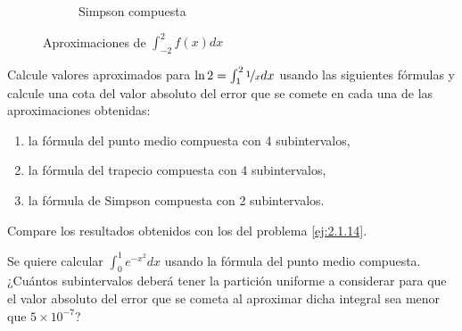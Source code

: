 \begin{ejercicio}
\begin{enumerate}
\begin{figure}
\begin{subfigure}[b]{0.3\textwidth}
                \caption{Simpson compuesta}
                \label{fig:ej2.1.17c}
            \end{subfigure}
            \caption{Aproximaciones de $\int_{-2}^{2} f(x) dx$}
            \label{fig:ej2.1.17}
        \end{figure}
    \end{enumerate}
\end{ejercicio}

\begin{ejercicio}\label{ej:2.1.18}
    Calcule valores aproximados para $\ln 2 = \int_{1}^{2} \nicefrac{1}{x} dx$ usando las siguientes fórmulas y calcule una cota del valor absoluto del error que se comete en cada una de las aproximaciones obtenidas:
    \begin{enumerate}
        \item la fórmula del punto medio compuesta con 4 subintervalos,
        \item la fórmula del trapecio compuesta con 4 subintervalos,
        \item la fórmula de Simpson compuesta con 2 subintervalos.
    \end{enumerate}
    
    Compare los resultados obtenidos con los del problema \ref{ej:2.1.14}.
\end{ejercicio}

\begin{ejercicio}\label{ej:2.1.19}
    Se quiere calcular $\int_{0}^{1} e^{-x^2} dx$ usando la fórmula del punto medio compuesta. ¿Cuántos subintervalos deberá tener la partición uniforme a considerar para que el valor absoluto del error que se cometa al aproximar dicha integral sea menor que $5 \times 10^{-7}$?
\end{ejercicio}

